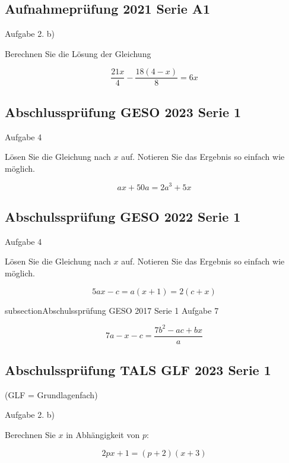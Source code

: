 \subsection{Aufnahmeprüfung 2021 Serie A1}
Aufgabe 2. b)

Berechnen Sie die Lösung der Gleichung

$$\frac{21x}{4} - \frac{18(4-x)}{8} = 6x$$


\subsection{Abschlussprüfung GESO 2023 Serie 1}
Aufgabe 4

Lösen Sie die Gleichung nach $x$ auf. Notieren Sie das Ergebnis so
einfach wie möglich.

$$ax + 50a = 2a^3 + 5x$$


\subsection{Abschulssprüfung GESO 2022 Serie 1}
Aufgabe 4

Lösen Sie die Gleichung nach $x$ auf. Notieren Sie das Ergebnis so
einfach wie möglich.

$$5ax - c = a(x+1) = 2(c+x)$$


subsection{Abschulssprüfung GESO 2017 Serie 1}
Aufgabe 7

$$7a -x -c = \frac{7b^2 -ac +bx}{a}$$


\subsection{Abschulssprüfung TALS GLF 2023 Serie 1}
(GLF = Grundlagenfach)

Aufgabe 2. b)

Berechnen Sie $x$ in Abhängigkeit von $p$:

$$2px + 1 = (p+2)(x+3)$$



